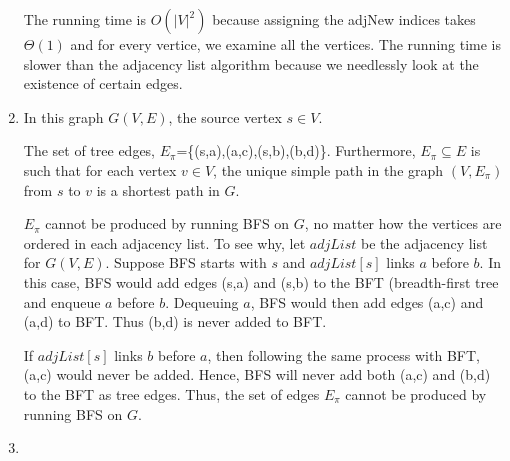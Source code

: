 \documentclass[a4paper]{report}
\begin{document}
\begin{enumerate}
      The running time is $O(|V|^2)$ because assigning the adjNew indices takes $\Theta(1)$ and for every vertice, we examine all the vertices. 
      The running time is slower than the adjacency list algorithm because we needlessly look at the existence of certain edges. 

    \bigskip
    \setcounter{equation}{0}
    \item 

      \bigskip

      In this graph $G(V,E)$, the source vertex $s \in V$. 

      The set of tree edges, $E_{\pi}$=\{(s,a),(a,c),(s,b),(b,d)\}. Furthermore, $E_{\pi} \subseteq E$ 
      is such that for each vertex $v \in V$, the unique simple path in the graph $(V,E_{\pi})$ from $s$ to $v$
      is a shortest path in $G$.

      $E_{\pi}$ cannot be produced by running BFS on $G$, no matter how the vertices are ordered in each adjacency list.
      To see why, let $adjList$ be the adjacency list for $G(V,E)$. Suppose BFS starts with $s$ and $adjList[s]$ links $a$ before $b$.
      In this case, BFS would add edges (s,a) and (s,b) to the BFT (breadth-first tree and enqueue $a$ before $b$. Dequeuing $a$,
      BFS would then add edges (a,c) and (a,d) to BFT. Thus (b,d) is never added to BFT.

      If $adjList[s]$ links $b$ before $a$, then following the same process with BFT, (a,c) would never be added. Hence, BFS will never
      add both (a,c) and (b,d) to the BFT as tree edges. Thus, the set of edges $E_{\pi}$ cannot be produced by running BFS on $G$. 

    \pagebreak
    \bigskip
    \setcounter{equation}{0}
    \item 


\end{enumerate}
\end{document}
